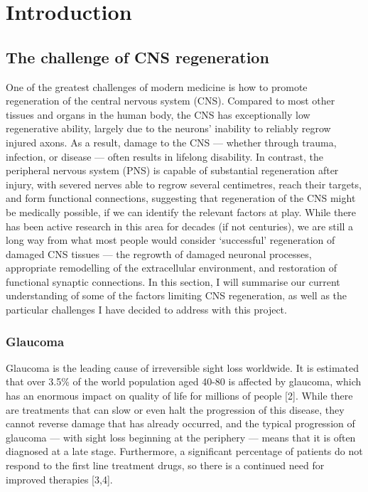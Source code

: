 \documentclass[
  12pt,
  a4paper,
]{book}
\begin{document}
\chapter*{Introduction}\label{INTRODUCTION}


\section{The challenge of CNS regeneration}\label{the-challenge-of-cns-regeneration}

One of the greatest challenges of modern medicine is how to promote regeneration of the central nervous system (CNS). Compared to most other tissues and organs in the human body, the CNS has exceptionally low regenerative ability, largely due to the neurons' inability to reliably regrow injured axons. As a result, damage to the CNS --- whether through trauma, infection, or disease --- often results in lifelong disability. In contrast, the peripheral nervous system (PNS) is capable of substantial regeneration after injury, with severed nerves able to regrow several centimetres, reach their targets, and form functional connections, suggesting that regeneration of the CNS might be medically possible, if we can identify the relevant factors at play. While there has been active research in this area for decades (if not centuries), we are still a long way from what most people would consider `successful' regeneration of damaged CNS tissues --- the regrowth of damaged neuronal processes, appropriate remodelling of the extracellular environment, and restoration of functional synaptic connections. In this section, I will summarise our current understanding of some of the factors limiting CNS regeneration, as well as the particular challenges I have decided to address with this project.

\subsection{Glaucoma}\label{glaucoma}

Glaucoma is the leading cause of irreversible sight loss worldwide. It is estimated that over 3.5\% of the world population aged 40-80 is affected by glaucoma, which has an enormous impact on quality of life for millions of people {[}2{]}. While there are treatments that can slow or even halt the progression of this disease, they cannot reverse damage that has already occurred, and the typical progression of glaucoma --- with sight loss beginning at the periphery --- means that it is often diagnosed at a late stage. Furthermore, a significant percentage of patients do not respond to the first line treatment drugs, so there is a continued need for improved therapies {[}3,4{]}.
\end{document}
